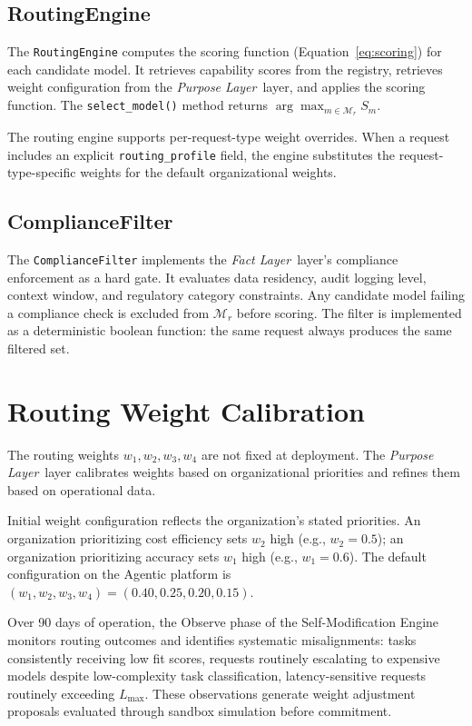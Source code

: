 \documentclass[12pt]{article}
\newcommand{\purpose}{\textit{Purpose Layer}}
\newcommand{\fact}{\textit{Fact Layer}}
\begin{document}
\subsection{RoutingEngine}
The \texttt{RoutingEngine} computes the scoring function (Equation~\ref{eq:scoring}) for each candidate model. It retrieves capability scores from the registry, retrieves weight configuration from the \purpose\ layer, and applies the scoring function. The \texttt{select\_model()} method returns $\arg\max_{m \in \mathcal{M}_r} S_m$.

The routing engine supports per-request-type weight overrides. When a request includes an explicit \texttt{routing\_profile} field, the engine substitutes the request-type-specific weights for the default organizational weights.

\subsection{ComplianceFilter}
The \texttt{ComplianceFilter} implements the \fact\ layer's compliance enforcement as a hard gate. It evaluates data residency, audit logging level, context window, and regulatory category constraints. Any candidate model failing a compliance check is excluded from $\mathcal{M}_r$ before scoring. The filter is implemented as a deterministic boolean function: the same request always produces the same filtered set.

\section{Routing Weight Calibration}
\label{sec:weight-calibration}

The routing weights $w_1, w_2, w_3, w_4$ are not fixed at deployment. The \purpose\ layer calibrates weights based on organizational priorities and refines them based on operational data.

Initial weight configuration reflects the organization's stated priorities. An organization prioritizing cost efficiency sets $w_2$ high (e.g., $w_2 = 0.5$); an organization prioritizing accuracy sets $w_1$ high (e.g., $w_1 = 0.6$). The default configuration on the Agentic platform is $(w_1, w_2, w_3, w_4) = (0.40, 0.25, 0.20, 0.15)$.

Over 90 days of operation, the Observe phase of the Self-Modification Engine monitors routing outcomes and identifies systematic misalignments: tasks consistently receiving low fit scores, requests routinely escalating to expensive models despite low-complexity task classification, latency-sensitive requests routinely exceeding $L_{\max}$. These observations generate weight adjustment proposals evaluated through sandbox simulation before commitment.
\end{document}

